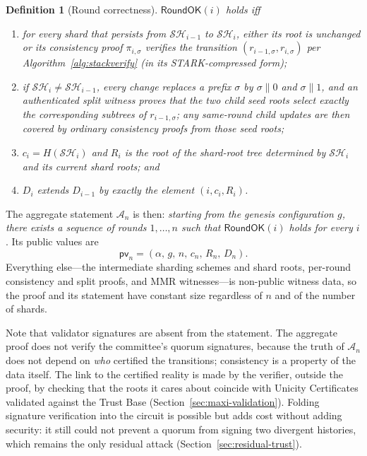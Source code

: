 \documentclass[twocolumn]{article}
\newtheorem{definition}{Definition}
\begin{document}
\begin{definition}[Round correctness]
\label{def:roundok}
$\mathsf{RoundOK}(i)$ holds iff
\begin{enumerate}[nosep]
  \item for every shard that persists from $\mathcal{SH}_{i-1}$ to $\mathcal{SH}_i$, either its root is unchanged or its consistency proof $\pi_{i,\sigma}$ verifies the transition $(r_{i-1,\sigma},r_{i,\sigma})$ per Algorithm~\ref{alg:stackverify} (in its STARK-compressed form);
  \item if $\mathcal{SH}_i\ne\mathcal{SH}_{i-1}$, every change replaces a prefix $\sigma$ by $\sigma\|0$ and $\sigma\|1$, and an authenticated split witness proves that the two child seed roots select exactly the corresponding subtrees of $r_{i-1,\sigma}$; any same-round child updates are then covered by ordinary consistency proofs from those seed roots;
  \item $c_i=H(\mathcal{SH}_i)$ and $R_i$ is the root of the shard-root tree determined by $\mathcal{SH}_i$ and its current shard roots; and
  \item $D_i$ extends $D_{i-1}$ by exactly the element $(i,c_i,R_i)$.
\end{enumerate}
\end{definition}

The aggregate statement $\mathcal{A}_n$ is then: \emph{starting from the genesis configuration $g$, there exists a sequence of rounds $1, \ldots, n$ such that $\mathsf{RoundOK}(i)$ holds for every $i$}. Its public values are
\[ \mathsf{pv}_n = (\alpha,\, g,\, n,\, c_n,\, R_n,\, D_n). \]
Everything else---the intermediate sharding schemes and shard roots, per-round consistency and split proofs, and MMR witnesses---is non-public witness data, so the proof and its statement have constant size regardless of $n$ and of the number of shards.

Note that validator signatures are absent from the statement. The aggregate proof does not verify the committee's quorum signatures, because the truth of $\mathcal{A}_n$ does not depend on \emph{who} certified the transitions; consistency is a property of the data itself. The link to the certified reality is made by the verifier, outside the proof, by checking that the roots it cares about coincide with Unicity Certificates validated against the Trust Base (Section~\ref{sec:maxi-validation}). Folding signature verification into the circuit is possible but adds cost without adding security: it still could not prevent a quorum from signing two divergent histories, which remains the only residual attack (Section~\ref{sec:residual-trust}).
\end{document}
